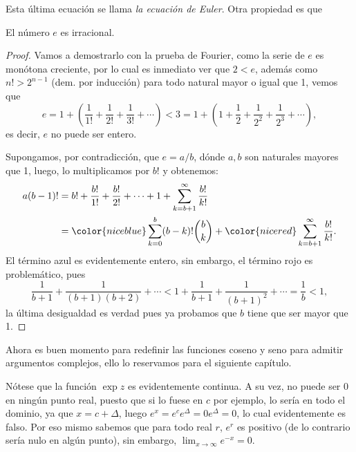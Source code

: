\documentclass[11pt,oneside,a4paper]{book}
\begin{document}
Esta última ecuación se llama \textit{la ecuación de Euler}. Otra propiedad es que
\begin{thm}
El número $e$ es irracional.
\end{thm}
\begin{proof}
Vamos a demostrarlo con la prueba de Fourier, como la serie de $e$ es monótona creciente, por lo cual es inmediato ver que $2\lt e$, además como $n!\gt 2^{n-1}$ (dem. por inducción) para todo natural mayor o igual que 1, vemos que
$$e=1+\left(\frac{1}{1!}+\frac{1}{2!}+\frac{1}{3!}+\cdots\right)\lt 3=1+\left(1+\frac{1}{2}+\frac{1}{2^2}+\frac{1}{2^3}+\cdots\right),$$
es decir, $e$ no puede ser entero.

Supongamos, por contradicción, que $e=a/b$, dónde $a,b$ son naturales mayores que 1, luego, lo multiplicamos por $b!$ y obtenemos:
\begin{align*}
a(b-1)!&=b!+\frac{b!}{1!}+\frac{b!}{2!}+\cdots+1+\sum_{k=b+1}^\infty\frac{b!}{k!}\\
&={\color{niceblue}\sum_{k=0}^b(b-k)!\binom{b}{k}}+{\color{nicered}\sum_{k=b+1}^\infty\frac{b!}{k!}}.
\end{align*}
El término azul es evidentemente entero, sin embargo, el término rojo es problemático, pues
$$\frac{1}{b+1}+\frac{1}{(b+1)(b+2)}+\cdots\lt1+\frac{1}{b+1}+\frac{1}{(b+1)^2}+\cdots=\frac{1}{b}\lt 1,$$
la última desigualdad es verdad pues ya probamos que $b$ tiene que ser mayor que 1.
\end{proof}
Ahora es buen momento para redefinir las funciones coseno y seno para admitir argumentos complejos, ello lo reservamos para el siguiente capítulo.

Nótese que la función $\exp z$ es evidentemente continua. A su vez, no puede ser 0 en ningún punto real, puesto que si lo fuese en $c$ por ejemplo, lo sería en todo el dominio, ya que $x=c+\Delta$, luego $e^x=e^ce^\Delta=0e^\Delta=0$, lo cual evidentemente es falso. Por eso mismo sabemos que para todo real $r$, $e^r$ es positivo (de lo contrario sería nulo en algún punto), sin embargo, $\lim_{x\to\infty}e^{-x}=0$.
\end{document}
